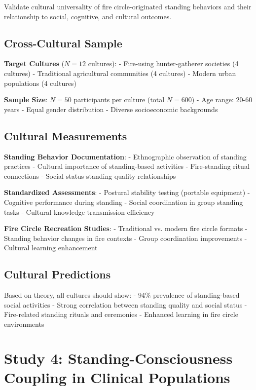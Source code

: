 \documentclass[12pt]{article}
\begin{document}
Validate cultural universality of fire circle-originated standing behaviors and their relationship to social, cognitive, and cultural outcomes.

\subsection{Cross-Cultural Sample}

\textbf{Target Cultures} ($N = 12$ cultures):
- Fire-using hunter-gatherer societies (4 cultures)
- Traditional agricultural communities (4 cultures)  
- Modern urban populations (4 cultures)

\textbf{Sample Size}: $N = 50$ participants per culture (total $N = 600$)
- Age range: 20-60 years
- Equal gender distribution
- Diverse socioeconomic backgrounds

\subsection{Cultural Measurements}

\textbf{Standing Behavior Documentation}:
- Ethnographic observation of standing practices
- Cultural importance of standing-based activities  
- Fire-standing ritual connections
- Social status-standing quality relationships

\textbf{Standardized Assessments}:
- Postural stability testing (portable equipment)
- Cognitive performance during standing
- Social coordination in group standing tasks
- Cultural knowledge transmission efficiency

\textbf{Fire Circle Recreation Studies}:
- Traditional vs. modern fire circle formats
- Standing behavior changes in fire contexts
- Group coordination improvements
- Cultural learning enhancement

\subsection{Cultural Predictions}

Based on theory, all cultures should show:
- 94\% prevalence of standing-based social activities
- Strong correlation between standing quality and social status
- Fire-related standing rituals and ceremonies
- Enhanced learning in fire circle environments

\section{Study 4: Standing-Consciousness Coupling in Clinical Populations}
\end{document}
